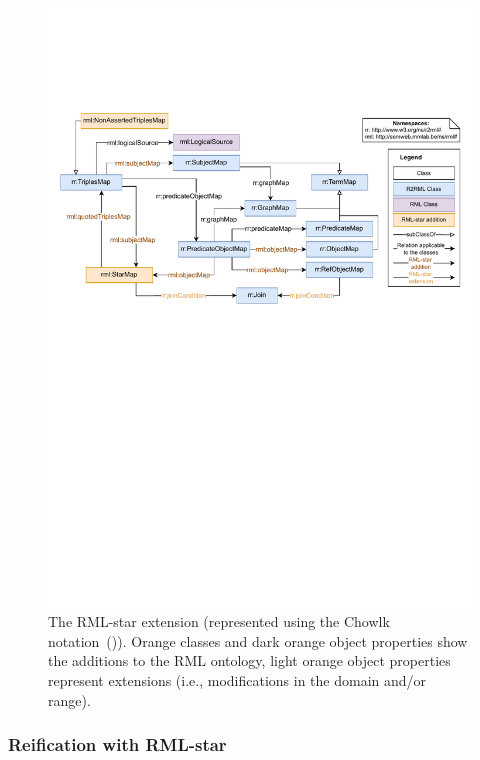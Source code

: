 \begin{figure}[!t]
\centering
\includegraphics[width=1\linewidth]{figures/rml-star_diagram.pdf}
\caption{The \mbox{RML-star} extension (represented using the Chowlk notation~(\cite{feria2022chowlk})). Orange classes and dark orange object properties show the additions to the RML ontology, light orange object properties represent extensions (i.e., modifications in the domain and/or range).}
\label{fig:rml-star}
\end{figure}



\subsubsection{Reification with RML-star}

